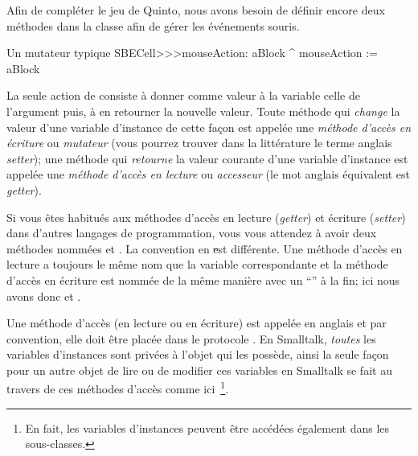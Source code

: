 \documentclass[a4paper,10pt,twoside]{book}
\begin{document}
Afin de compléter le jeu de Quinto, nous avons besoin de définir encore deux méthodes dans la classe  afin de gérer les événements souris.
\begin{method}[mouseAction:]{Un mutateur typique}
SBECell>>>mouseAction: aBlock
   ^ mouseAction := aBlock
\end{method}

La seule action de  consiste \`a donner comme
valeur à la variable  celle de l'argument puis, \`a en
retourner la nouvelle valeur. Toute méthode qui \emph{change} la
valeur d'une variable d'instance de cette façon est appelée une
\emph{méthode d'accès en \'ecriture} ou \emph{mutateur} (vous pourrez
trouver dans la litt\'erature le terme anglais \emph{setter}); une
méthode qui \emph{retourne} la valeur courante d'une variable
d'instance est appelée une \emph{méthode d'accès en lecture} ou
\emph{accesseur} (le mot anglais \'equivalent est \emph{getter}).

Si vous êtes habitués aux méthodes d'accès en lecture (\emph{getter})
et écriture (\emph{setter}) dans d'autres langages de programmation,
vous vous attendez à avoir deux méthodes nommées 
et .
La convention en \st est différente.
Une méthode d'accès en lecture a toujours le même nom que la variable
correspondante et la méthode d'accès en écriture est nommée de la même
manière avec un ``\ct{:}'' à la fin; ici nous avons donc
 et .

Une m\'ethode d'acc\`es (en lecture ou en \'ecriture) est appel\'ee
en anglais  et par convention, elle doit \^etre
plac\'ee dans le protocole .
En Smalltalk, \emph{toutes} les variables d'instances sont privées à
l'objet qui les possède, ainsi la seule façon pour un autre objet de
lire ou de modifier ces variables en Smalltalk se fait au travers de
ces méthodes d'accès comme ici~\footnote{En fait, les variables
  d'instances peuvent être accédées également dans les sous-classes.}.
\end{document}
